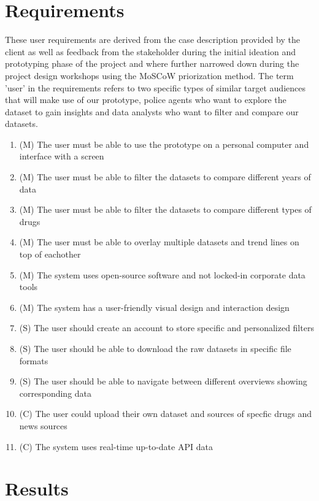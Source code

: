 \section{Requirements}

These user requirements are derived from the case description provided by the client as well as feedback from the stakeholder during the initial ideation and prototyping phase of the project and where further narrowed down during the project design workshops using the MoSCoW priorization method. The term 'user' in the requirements refers to two specific types of similar target audiences that will make use of our prototype, police agents who want to explore the dataset to gain insights and data analysts who want to filter and compare our datasets.

\begin{enumerate}
  \item (M) The user must be able to use the prototype on a personal computer and interface with a screen
  \item (M) The user must be able to filter the datasets to compare different years of data
  \item (M) The user must be able to filter the datasets to compare different types of drugs
  \item (M) The user must be able to overlay multiple datasets and trend lines on top of eachother
  \item (M) The system uses open-source software and not locked-in corporate data tools
  \item (M) The system has a user-friendly visual design and interaction design
  \item (S) The user should create an account to store specific and personalized filters
  \item (S) The user should be able to download the raw datasets in specific file formats
  \item (S) The user should be able to navigate between different overviews showing corresponding data
  \item (C) The user could upload their own dataset and sources of specfic drugs and news sources
  \item (C) The system uses real-time up-to-date API data
\end{enumerate}

\section{Results}
